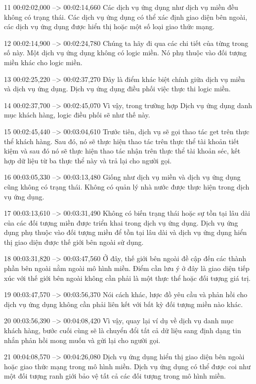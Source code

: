 11
00:02:02,000 --> 00:02:14,660
Các dịch vụ ứng dụng như dịch vụ miền đều không có trạng thái.  Các dịch vụ ứng dụng có thể xác định giao diện bên ngoài, các dịch vụ ứng dụng được hiển thị hoặc một số loại giao thức mạng.

12
00:02:14,900 --> 00:02:24,780
Chúng ta hãy đi qua các chi tiết của từng trong số này.  Một dịch vụ ứng dụng không có logic miền.  Nó phụ thuộc vào đối tượng miền khác cho logic miền.

13
00:02:25,220 --> 00:02:37,270
Đây là điểm khác biệt chính giữa dịch vụ miền và dịch vụ ứng dụng.  Dịch vụ ứng dụng điều phối việc thực thi logic miền.

14
00:02:37,700 --> 00:02:45,070
Vì vậy, trong trường hợp Dịch vụ ứng dụng danh mục khách hàng, logic điều phối sẽ như thế này.

15
00:02:45,440 --> 00:03:04,610
Trước tiên, dịch vụ sẽ gọi thao tác get trên thực thể khách hàng.  Sau đó, nó sẽ thực hiện thao tác trên thực thể tài khoản tiết kiệm và sau đó nó sẽ thực hiện thao tác nhận trên thực thể tài khoản séc, kết hợp dữ liệu từ ba thực thể này và trả lại cho người gọi.

16
00:03:05,330 --> 00:03:13,480
Giống như dịch vụ miền và dịch vụ ứng dụng cũng không có trạng thái.  Không có quản lý nhà nước được thực hiện trong dịch vụ ứng dụng.

17
00:03:13,610 --> 00:03:31,490
Không có biến trạng thái hoặc sự tồn tại lâu dài của các đối tượng miền được triển khai trong dịch vụ ứng dụng.  Dịch vụ ứng dụng phụ thuộc vào đối tượng miền để tồn tại lâu dài và dịch vụ ứng dụng hiển thị giao diện được thế giới bên ngoài sử dụng.

18
00:03:31,820 --> 00:03:47,560
Ở đây, thế giới bên ngoài đề cập đến các thành phần bên ngoài nằm ngoài mô hình miền.  Điểm cần lưu ý ở đây là giao diện tiếp xúc với thế giới bên ngoài không cần phải là một thực thể hoặc đối tượng giá trị.

19
00:03:47,570 --> 00:03:56,370
Nói cách khác, lược đồ yêu cầu và phản hồi cho dịch vụ ứng dụng không cần phải liên kết với bất kỳ đối tượng miền nào khác.

20
00:03:56,390 --> 00:04:08,420
Vì vậy, quay lại ví dụ về dịch vụ danh mục khách hàng, bước cuối cùng sẽ là chuyển đổi tất cả dữ liệu sang định dạng tin nhắn phản hồi mong muốn và gửi lại cho người gọi.

21
00:04:08,570 --> 00:04:26,080
Dịch vụ ứng dụng hiển thị giao diện bên ngoài hoặc giao thức mạng trong mô hình miền.  Dịch vụ ứng dụng có thể được coi như một đối tượng ranh giới bảo vệ tất cả các đối tượng trong mô hình miền.

